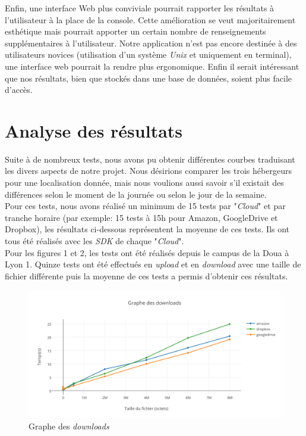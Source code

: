 \documentclass[10pt]{article}
\begin{document}
Enfin, une interface Web plus conviviale pourrait rapporter les résultats à
l'utilisateur à la place de la console. Cette amélioration se veut
majoritairement esthétique mais pourrait apporter un certain nombre de
renseignements supplémentaires à l'utilisateur. Notre application n'est pas
encore destinée à des utilisateurs novices (utilisation d'un système
\textit{Unix} et uniquement en terminal), une interface web pourrait la rendre
plus ergonomique. Enfin il serait intéressant que nos résultats, bien que
stockés dans une base de données, soient plus facile d'accès.


\newpage \section{Analyse des résultats}

Suite à de nombreux tests, nous avons pu obtenir différentes courbes traduisant
les divers aspects de notre projet. Nous désirions comparer les trois
hébergeurs pour une localisation donnée, mais nous voulions aussi savoir s'il
existait des différences selon le moment de la journée ou selon le jour de la
semaine.\\

Pour ces tests, nous avons réalisé un minimum de 15 tests par "\textit{Cloud}"
et par tranche horaire (par exemple: 15 tests à 15h pour Amazon, GoogleDrive et
Dropbox), les résultats ci-dessous représentent la moyenne de ces tests. Ils
ont tous été réalisés avec les \textit{SDK} de chaque "\textit{Cloud}".\\

Pour les figures 1 et 2, les tests ont été réalisés depuis le campus de la Doua
à Lyon 1. Quinze tests ont été effectués en \textit{upload} et en
\textit{download} avec une taille de fichier différente puis la moyenne de ces
tests a permis d'obtenir ces résultats.

\begin{figure}[h] \centering
\includegraphics[scale=0.65]{graphe_des_downloads.png} \caption{Graphe des
\textit{downloads}} \end{figure}
\end{document}
